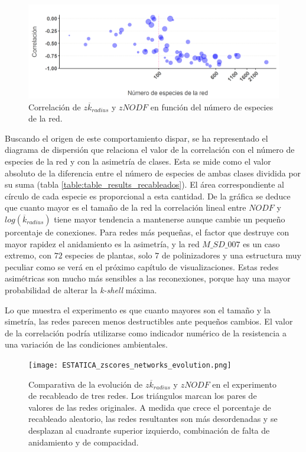 \begin{figure}[h!]
\centering
\includegraphics[scale=0.6]{Figures/ESTATITCA_asimetria_corr.png}
\caption {Correlación de $z \overline {k}_{radius}$ y $zNODF$ en función del número de especies de la red.}
\label{fig:ESTATICA_asimetria_corr}
\end{figure}

Buscando el origen de este comportamiento dispar, se ha representado el diagrama de dispersión que relaciona el valor de la correlación con el número de especies de la red y con la asimetría de clases. Esta se mide como el valor absoluto de la diferencia entre el número de especies de ambas clases dividida por su suma (tabla \ref{table:table_results_recableados}). El área correspondiente al círculo de cada especie es proporcional a esta cantidad. De la gráfica se deduce que cuanto mayor es el tamaño de la red la correlación lineal entre $NODF$ y $log(\overline {k}_{radius})$ tiene mayor tendencia a mantenerse aunque cambie un pequeño porcentaje de conexiones. Para redes más pequeñas, el factor que destruye con mayor rapidez el anidamiento es la asimetría, y la red $M\_SD\_007$ es un caso extremo, con $72$ especies de plantas, solo $7$ de polinizadores y una estructura muy peculiar como se verá en el próximo capítulo de visualizaciones. Estas redes asimétricas son mucho más sensibles a las reconexiones, porque hay una mayor probabilidad de alterar la \textit{k-shell} máxima.

Lo que muestra el experimento es que cuanto  mayores son el tamaño y la simetría, las redes parecen menos destructibles ante pequeños cambios. El valor de la correlación podría utilizarse como indicador numérico de la resistencia a una variación de las condiciones ambientales.

\begin{figure}[h!]
\centering
\texttt{[image: ESTATICA\_zscores\_networks\_evolution.png]}
\caption {Comparativa de la evolución de $z \overline {k}_{radius}$ y $zNODF$ en el experimento de recableado de tres redes. Los triángulos marcan los pares de valores de las redes originales. A medida que crece el porcentaje de recableado aleatorio, las redes resultantes son más desordenadas y se desplazan al cuadrante superior izquierdo, combinación de falta de anidamiento y de compacidad.}
\label{fig:ESTATICA_asimetria_corr}
\end{figure}

